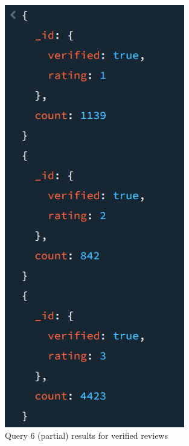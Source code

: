 \begin{figure}[H]
  \centering
  \begin{minipage}{0.45\textwidth}
      \centering
      \includegraphics[width=0.7\textwidth]{Images/q6_result_1.png}
      \caption{Query 6 (partial) results for verified reviews}
  \end{minipage}\hfill
  \begin{minipage}{0.45\textwidth}
      \centering

\end{minipage}
\end{figure}
